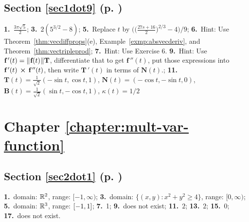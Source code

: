 \begin{multicols}{2}
\subsection*{Section \ref{sec1dot9} (p. \pageref{sec1dot9})}

\textbf{1.}~$\frac{3\pi \sqrt{5}}{2}$;\quad 
\textbf{3.}~$2 (5^{3/2} - 8)$;\quad 
\textbf{5.}~Replace $t$ by
$\biggl( \biggl( \frac{27s + 16}{2} \biggr)^{2/3} - 4 \biggr)\bigg/ 9$;\quad 
\textbf{6.}~Hint: Use Theorem~\ref{thm:vecdiffprops}(e), Example~\ref{exmp:absvecderiv}, and Theorem~\ref{thm:vectripleprod};\quad 
\textbf{7.}~Hint:
Use Exercise 6.
\textbf{9.}~Hint: Use $\textbf{f}\,'(t) = \lVert\mspace{1mu}\textbf{f}(t)\mspace{1mu}\rVert\textbf{T}$, differentiate that
to get $\textbf{f}\,''(t)$, put those expressions into $\textbf{f}\,'(t)\, \bm{\times} \,\textbf{f}\,''(t)$, then
write $\textbf{T}\,'(t)$ in terms of $\textbf{N}(t)$.;\quad 
\textbf{11.}~$\textbf{T}(t) = \frac{1}{\sqrt{2}}
(-\sin t,\cos t,1)$, $\textbf{N}(t) = (-\cos t,-\sin t,0)$, $\textbf{B}(t) = \frac{1}{\sqrt{2}}(\sin t,-\cos t,1)$,
$\kappa(t) = 1/2$
\section*{Chapter \ref{chapter:mult-var-function}}
\subsection*{Section \ref{sec2dot1} (p. \pageref{sec2dot1})}

\textbf{1.}~domain: $\mathbb{R}^{2}$, range: $\lbrack -1,\infty )$;\quad
\textbf{3.}~domain: $\lbrace (x,y): x^2 + y^2 \ge 4 \rbrace$, range: $\lbrack 0,\infty)$;\quad
\textbf{5.}~domain:
$\mathbb{R}^{3}$, range: $\lbrack -1,1 \rbrack$;\quad
\textbf{7.}~1;\quad
\textbf{9.}~does not exist;\quad
\textbf{11.}~$2$;\quad
\textbf{13.}~$2$;\quad
\textbf{15.}~$0$;\quad
\textbf{17.}~does not exist.


\end{multicols}

